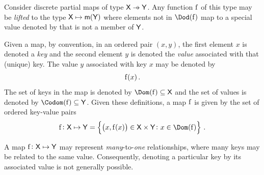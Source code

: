 \documentclass[11pt,final,hidelinks]{article}
\providecommand{\Nothing}{\mathsf{nothing}}
\begin{document}
Consider discrete partial maps of type $\Set{X} \pfun \Set{Y}$.
Any function $\Fun{f}$ of this type may be \emph{lifted} to the type $\Set{X} \mapsto \Maybe{\Set{Y}}$ where elements not in $\Dod(\Fun{f})$ map to a special value denoted by \Nothing that is not a member of $\Set{Y}$.




Given a map, by convention, in an ordered pair $(x, y)$, the first element $x$ is denoted a \emph{key} and the second element $y$ is denoted the \emph{value} associated with that (unique) key. The value $y$ associated with key $x$ may be denoted by
\begin{equation}
\Fun{f}(x)\,.
\end{equation}
The set of keys in the map is denoted by $\Dom(\Fun{f}) \subseteq \Set{X}$ and the set of values is denoted by $\Codom(\Fun{f}) \subseteq \Set{Y}$. Given these definitions, a map $\Fun{f}$ is given by the set of ordered key-value pairs
\begin{equation}
\Fun{f} \colon \Set{X} \mapsto \Set{Y} = \left\{
\left(x, \Fun{f}(x)\right) \in \Set{X} \times \Set{Y} \colon x \in \Dom(\Fun{f})
\right\}\,.
\end{equation}

A map $\Fun{f} \colon \Set{X} \mapsto \Set{Y}$ may represent \emph{many}-to-\emph{one} relationships, where many keys may be related to the same value. Consequently, denoting a particular key by its associated value is not generally possible.
\end{document}
